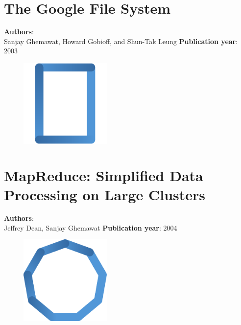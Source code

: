\documentclass[11pt,fleqn]{book} %
\begin{document}
\chapter{The Google File System}
\vspace*{-7mm}
\Large \textbf{Authors}: \\
Sanjay Ghemawat, Howard Gobioff, and Shun-Tak Leung
\newline\newline
\textbf{Publication year}: 2003
\begin{figure}[b]
    \centering
    \includegraphics[width=0.4\textwidth]{distributed-systems-rectangle-blue.pdf}
\end{figure}


\chapter{MapReduce: Simplified Data Processing on Large Clusters}
\vspace*{-7mm}
\Large \textbf{Authors}: \\
Jeffrey Dean, Sanjay Ghemawat
\newline\newline
\textbf{Publication year}: 2004
\begin{figure}[b]
    \centering
    \includegraphics[width=0.4\textwidth]{distributed-systems-blue.pdf}
\end{figure}

\end{document}
